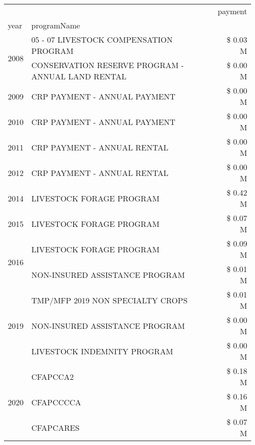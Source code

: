 \begin{tabular}{llr}
\toprule
 &  & payment \\
year & programName &  \\
\midrule
\multirow[t]{2}{*}{2008} & 05 - 07 LIVESTOCK COMPENSATION PROGRAM & \$ 0.03 M \\
 & CONSERVATION RESERVE PROGRAM - ANNUAL LAND RENTAL & \$ 0.00 M \\
\cline{1-3}
2009 & CRP PAYMENT - ANNUAL PAYMENT & \$ 0.00 M \\
\cline{1-3}
2010 & CRP PAYMENT - ANNUAL PAYMENT & \$ 0.00 M \\
\cline{1-3}
2011 & CRP PAYMENT - ANNUAL RENTAL & \$ 0.00 M \\
\cline{1-3}
2012 & CRP PAYMENT - ANNUAL RENTAL & \$ 0.00 M \\
\cline{1-3}
2014 & LIVESTOCK FORAGE PROGRAM & \$ 0.42 M \\
\cline{1-3}
2015 & LIVESTOCK FORAGE PROGRAM & \$ 0.07 M \\
\cline{1-3}
\multirow[t]{2}{*}{2016} & LIVESTOCK FORAGE PROGRAM                      & \$ 0.09 M \\
 & NON-INSURED ASSISTANCE PROGRAM                & \$ 0.01 M \\
\cline{1-3}
\multirow[t]{3}{*}{2019} & TMP/MFP 2019 NON SPECIALTY CROPS & \$ 0.01 M \\
 & NON-INSURED ASSISTANCE PROGRAM & \$ 0.00 M \\
 & LIVESTOCK INDEMNITY PROGRAM & \$ 0.00 M \\
\cline{1-3}
\multirow[t]{3}{*}{2020} & CFAPCCA2 & \$ 0.18 M \\
 & CFAPCCCCA & \$ 0.16 M \\
 & CFAPCARES & \$ 0.07 M \\
\cline{1-3}
\bottomrule
\end{tabular}
